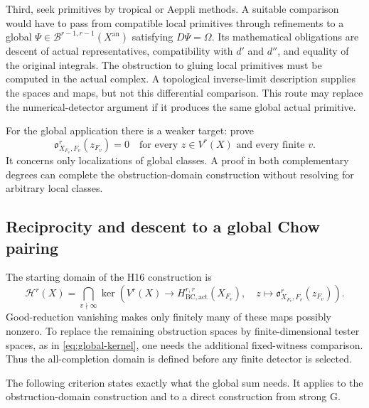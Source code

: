 \documentclass[11pt]{article}
\theoremstyle{definition}
\numberwithin{equation}{section}
\newcommand{\an}{\mathrm{an}}
\newcommand{\B}{\mathcal B}
\newcommand{\Ob}{\mathfrak o}
\begin{document}
Third, seek primitives by tropical or Aeppli methods. A suitable comparison would have to pass from compatible local primitives through refinements to a global $\Psi\in\B^{r-1,r-1}(X^{\an})$ satisfying $D\Psi=\Omega$. Its mathematical obligations are descent of actual representatives, compatibility with $d'$ and $d''$, and equality of the original integrals. The obstruction to gluing local primitives must be computed in the actual complex. A topological inverse-limit description supplies the spaces and maps, but not this differential comparison. This route may replace the numerical-detector argument if it produces the same global actual primitive.

For the global application there is a weaker target: prove
\begin{equation}\label{eq:programme-global-vanishing}
 \Ob^r_{X_{F_v},F_v}(z_{F_v})=0
 \quad\text{for every }z\in V^r(X)
 \text{ and every finite }v.
\end{equation}
It concerns only localizations of global classes. A proof in both complementary degrees can complete the obstruction-domain construction without resolving  for arbitrary local classes.

\subsection{Reciprocity and descent to a global Chow pairing}\label{sec:programme-global}

The starting domain of the H16 construction is
\begin{equation}\label{eq:programme-all-completion}
 \mathcal H^r(X)=
 \bigcap_{v\nmid\infty}
 \ker\!\left(V^r(X)\longrightarrow
    H^{r,r}_{\mathrm{BC,act}}(X_{F_v}),\quad
    z\longmapsto\Ob^r_{X_{F_v},F_v}(z_{F_v})\right).
\end{equation}
Good-reduction vanishing makes only finitely many of these maps possibly nonzero. To replace the remaining obstruction spaces by finite-dimensional tester spaces, as in \eqref{eq:global-kernel}, one needs the additional fixed-witness comparison. Thus the all-completion domain is defined before any finite detector is selected.

The following criterion states exactly what the global sum needs. It applies to the obstruction-domain construction and to a direct construction from strong G.
\end{document}
